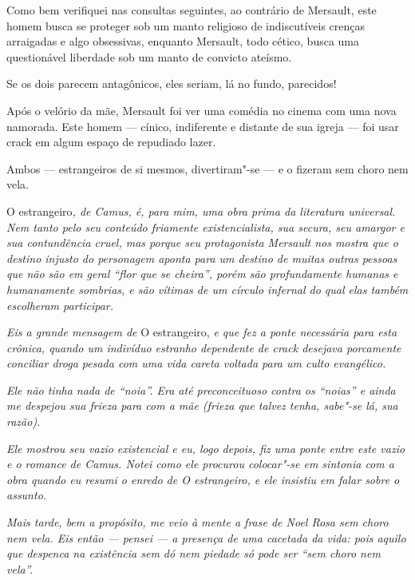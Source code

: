 Como bem verifiquei nas consultas seguintes, ao contrário de Mersault,
este homem busca se proteger sob um manto religioso de indiscutíveis
crenças arraigadas e algo obsessivas, enquanto Mersault, todo cético,
busca uma questionável liberdade sob um manto de convicto ateísmo.

Se os dois parecem antagônicos, eles seriam, lá no fundo, parecidos!

Após o velório da mãe, Mersault foi ver uma comédia no cinema com uma
nova namorada. Este homem --- cínico, indiferente e distante de sua
igreja --- foi usar crack em algum espaço de repudiado lazer.

Ambos --- estrangeiros de si mesmos, divertiram"-se --- e o fizeram sem
choro nem vela.

\begin{center}\asterisc{}\end{center}


O estrangeiro\emph{, de Camus, é, para mim, uma obra prima da literatura
universal. Nem tanto pelo seu conteúdo friamente existencialista, sua
secura, seu amargor e sua contundência cruel, mas porque seu
protagonista Mersault nos mostra que o destino injusto do personagem
aponta para um destino de muitas outras pessoas que não são em geral
``flor que se cheira'', porém são profundamente humanas e humanamente
sombrias, e são vítimas de um círculo infernal do qual elas também
escolheram participar.}~

\emph{Eis a grande mensagem de} O estrangeiro, \emph{e que fez a ponte
necessária para esta crônica, quando um indivíduo estranho dependente de
crack desejava porcamente conciliar droga pesada com uma vida careta
voltada para um culto evangélico.}~

\emph{Ele não tinha nada de ``noia''. Era até preconceituoso contra os
``noias'' e ainda me despejou sua frieza para com a mãe (frieza que
talvez tenha, sabe"-se lá, sua razão).}~

\emph{Ele mostrou seu vazio existencial e eu, logo depois, fiz uma ponte
entre este vazio e o romance de Camus. Notei como ele procurou
colocar"-se em sintonia com a obra quando eu resumi o enredo de O
estrangeiro, e ele insistiu em falar sobre o assunto.}

\emph{Mais tarde, bem a propósito, me veio à mente a frase de Noel Rosa
sem choro nem vela. Eis então --- pensei --- a presença de uma cacetada
da vida: pois aquilo que despenca na existência sem dó nem piedade só
pode ser ``sem choro nem vela''.}~

